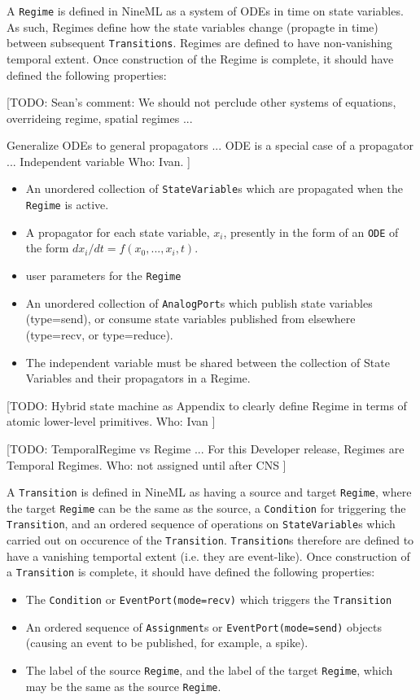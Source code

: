 \documentclass[a4paper]{article}
\newcommand\nmlClass[1]{{\tt #1}}
\begin{document}
A \nmlClass{Regime} is defined in NineML as a system of ODEs in time on
state variables.  As such, Regimes define how the state variables
change (propagte in time) between subsequent \nmlClass{Transitions}.
Regimes are defined to have non-vanishing temporal extent.  Once
construction of the Regime is complete, it should have defined the
following properties:

[TODO: 
Sean's comment:  
We should not perclude other systems of equations,
overrideing regime, spatial regimes ...

Generalize ODEs to general propagators ... 
ODE is a special case of a propagator ...
Independent variable
Who: Ivan.
]

\begin{itemize}
\item An unordered collection of \nmlClass{StateVariable}s which are propagated when the \nmlClass{Regime} is active.
\item A propagator for each state variable, $x_i$, presently in the
  form of an \nmlClass{ODE} of the form $dx_i/dt = f(x_0, ..., x_i, t)$.
\item user parameters for the \nmlClass{Regime}
\item An unordered collection of \nmlClass{AnalogPort}s which publish state variables (type=send),
  or consume state variables published from elsewhere (type=recv, or type=reduce).
\item The independent variable must be shared between the collection 
of State Variables and their propagators in a Regime.
\end{itemize}

[TODO: Hybrid state machine as Appendix to clearly define Regime
in terms of atomic lower-level primitives.
Who: Ivan
]

[TODO:
TemporalRegime vs Regime ...
For this Developer release, Regimes are Temporal Regimes.
Who: not assigned until after CNS
]

A \nmlClass{Transition} is defined in NineML as having a source and target
\nmlClass{Regime}, where the target \nmlClass{Regime} can be the same as the source, a
\nmlClass{Condition} for triggering the \nmlClass{Transition}, and an ordered sequence of
operations on \nmlClass{StateVariable}s which carried out on occurence of the
\nmlClass{Transition}.  \nmlClass{Transition}s therefore are defined to have a vanishing
temportal extent (i.e. they are event-like).  Once construction of a
\nmlClass{Transition} is complete, it should have defined the following properties:
\begin{itemize}
\item The \nmlClass{Condition} or \nmlClass{EventPort(mode=recv)} which triggers the \nmlClass{Transition}
\item An ordered sequence of \nmlClass{Assignment}s or
  \nmlClass{EventPort(mode=send)} objects (causing an event to be published, for example, a spike).
\item The label of the source \nmlClass{Regime}, and the label of the target
  \nmlClass{Regime}, which may be the same as the source \nmlClass{Regime}.
\end{itemize}
\end{document}
